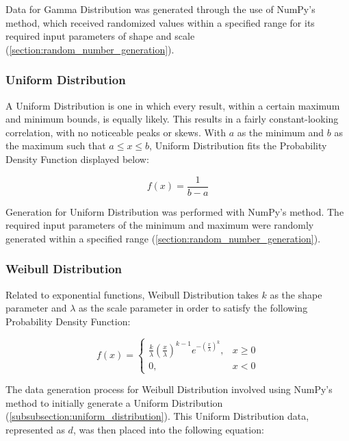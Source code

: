 \hfill

Data for Gamma Distribution was generated through the use of NumPy's  method, which received randomized values within a specified range for its required input parameters of shape and scale (\autoref{section:random_number_generation}). 


\subsubsection{Uniform Distribution}
\label{subsubsection:uniform_distribution}
A Uniform Distribution is one in which every result, within a certain maximum and minimum bounds, is equally likely. This results in a fairly constant-looking correlation, with no noticeable peaks or skews. With \(a\) as the minimum and \(b\) as the maximum such that \(a\le x\le b\), Uniform Distribution fits the Probability Density Function displayed below:

\begin{displaymath}
f(x) = \frac{1}{b-a}
\end{displaymath}

\hfill

Generation for Uniform Distribution was performed with NumPy's  method. The required input parameters of the minimum and maximum were randomly generated within a specified range (\autoref{section:random_number_generation}).

\subsubsection{Weibull Distribution}
Related to exponential functions, Weibull Distribution takes \(k\) as the shape parameter and \(\lambda\) as the scale parameter in order to satisfy the following Probability Density Function:

\begin{displaymath}
f(x) = \begin{cases} \frac{k}{\lambda}(\frac{x}{\lambda})^{k-1}e^{-(\frac{x}{\lambda})^k}, & x \ge 0 \\ 0, & x < 0 \end{cases}
\end{displaymath}

\hfill

The data generation process for Weibull Distribution involved using NumPy's  method to initially generate a Uniform Distribution (\autoref{subsubsection:uniform_distribution}). This Uniform Distribution data, represented as \(d\), was then placed into the following equation: 

